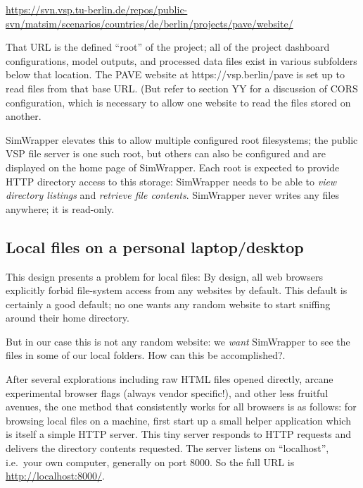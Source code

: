 \documentclass[3p,times,procedia]{elsarticle}
\begin{document}
\url{https://svn.vsp.tu-berlin.de/repos/public-svn/matsim/scenarios/countries/de/berlin/projects/pave/website/}

That URL is the defined ``root'' of the project; all of the project
dashboard configurations, model outputs, and processed data files exist
in various subfolders below that location. The PAVE website at
https://vsp.berlin/pave is set up to read files from that base URL. (But
refer to section YY for a discussion of CORS configuration, which is
necessary to allow one website to read the files stored on another.

SimWrapper elevates this to allow multiple configured root filesystems;
the public VSP file server is one such root, but others can also be
configured and are displayed on the home page of SimWrapper. Each root
is expected to provide HTTP directory access to this storage: SimWrapper
needs to be able to \emph{view directory listings} and \emph{retrieve
file contents}. SimWrapper never writes any files anywhere; it is
read-only.


\subsection{Local files on a personal laptop/desktop}

This design presents a problem for local files: By design, all web
browsers explicitly forbid file-system access from any websites by
default. This default is certainly a good default; no one wants any
random website to start sniffing around their home directory.

But in our case this is not any random website: we \emph{want}
SimWrapper to see the files in some of our local folders. How can this
be accomplished?.

After several explorations including raw HTML files opened directly,
arcane experimental browser flags (always vendor specific!), and other
less fruitful avenues, the one method that consistently works for all
browsers is as follows: for browsing local files on a machine, first
start up a small helper application which is itself a simple HTTP
server. This tiny server responds to HTTP requests and delivers the
directory contents requested. The server listens on ``localhost'',
i.e.~your own computer, generally on port 8000. So the full URL is
\url{http://localhost:8000/}.
\end{document}
